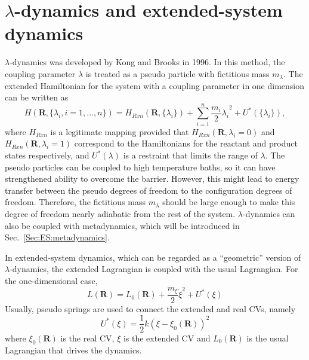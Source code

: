 \section{\texorpdfstring{$\lambda$-dynamics and extended-system dynamics}{λ-dynamics and extended-system dynamics}\label{Sec:ES:lambdadynamics}}
$\lambda$-dynamics was developed by Kong and Brooks in 1996.\cite{KongJCP1996} In this method, the coupling parameter $\lambda$ is treated as a pseudo particle with fictitious mass $m_\lambda$.
The extended Hamiltonian for the system with a coupling parameter in one dimension can be written as
\begin{equation}
	H(\mathbf{R},\{\lambda_i, i=1,\dots,n\})=H_{Rxn}(\mathbf{R},\{\lambda_i\}) + \sum_{i=1}^n\frac{m_i}{2}{\dot{\lambda}_i}^2+U^{*}(\{\lambda_i\}),
\end{equation}
where $H_{Rxn}$ is a legitimate mapping provided that $H_{Rxn}(\mathbf{R},\lambda_i=0)$ and $H_{Rxn}(\mathbf{R},\lambda_i=1)$ correspond to the Hamiltonians for the reactant and product states respectively, and $U^{*}(\lambda)$ is a restraint that limits the range of $\lambda$. The pseudo particles can be coupled to high temperature baths, so it can have strengthened ability to overcome the barrier. However, this might lead to energy transfer between the pseudo degrees of freedom to the configuration degrees of freedom. Therefore, the fictitious mass $m_\lambda$ should be large enough to make this degree of freedom nearly adiabatic from the rest of the system.\cite{AbramsJCP2006} $\lambda$-dynamics can also be coupled with metadynamics,\cite{WuJPCL2011} which will be introduced in Sec.~\ref{Sec:ES:metadynamics}.

In extended-system dynamics, which can be regarded as a ``geometric'' version of $\lambda$-dynamics, the extended Lagrangian is coupled with the usual Lagrangian. For the one-dimensional case,
\begin{equation}
	L(\mathbf{R})=L_{0}(\mathbf{R}) + \frac{m_\xi}{2}{\dot{\xi}}^2+U^{*}(\xi)
\end{equation}
Usually, pseudo springs are used to connect the extended and real CVs, namely
\begin{equation}
	U^{*}(\xi)=\frac{1}{2}k(\xi-\xi_{0}(\mathbf{R}))^{2}
\end{equation}
where $\xi_{0}(\mathbf{R})$ is the real CV, $\xi$ is the extended CV and $L_{0}(\mathbf{R})$ is the usual Lagrangian that drives the dynamics.

